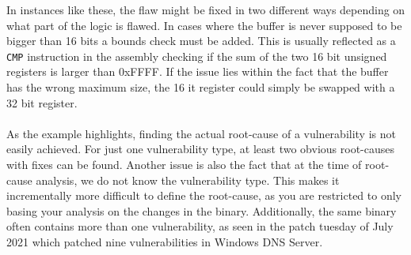 \documentclass{report}
\begin{document}
In instances like these, the flaw might be fixed in two different ways depending on what part of the logic is flawed. In cases where the buffer is never supposed to be bigger than 16 bits a bounds check must be added. This is usually reflected as a \texttt{CMP} instruction in the assembly checking if the sum of the two 16 bit unsigned registers is larger than 0xFFFF. If the issue lies within the fact that the buffer has the wrong maximum size, the 16 it register could simply be swapped with a 32 bit register.
\\
\\
As the example highlights, finding the actual root-cause of a vulnerability is not easily achieved. For just one vulnerability type, at least two obvious root-causes with fixes can be found. Another issue is also the fact that at the time of root-cause analysis, we do not know the vulnerability type. This makes it incrementally more difficult to define the root-cause, as you are restricted to only basing your analysis on the changes in the binary. Additionally, the same binary often contains more than one vulnerability, as seen in the patch tuesday of July 2021\cite{url:patch-tuesday:2021:july} which patched nine vulnerabilities in Windows DNS Server.

\end{document}
